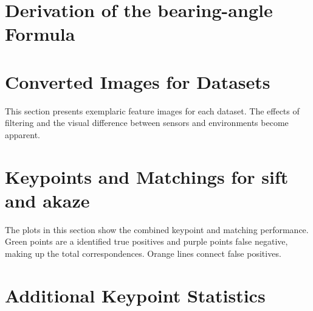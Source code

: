 \documentclass[numbers=noenddot,doktyp=marbeit,fontsize=12pt,sprache=english,hausschrift=true,draft=false]{TUBAFarbeiten}
\begin{document}
\begin{appendix}
    \renewcommand*{\thepage}{\thesection\arabic{page}}
    \renewcommand{\thetable}{\thesection\arabic{table}}
    \renewcommand{\thefigure}{\thesection\arabic{figure}}

    \newpage

    \section{Derivation of the \Gls{bearing-angle} Formula}\label{sec:bearing_derivation}
    
    \newpage

    \section{Converted Images for Datasets}

    This section presents exemplaric feature images for each dataset.
    The effects of filtering and the visual difference between sensors and environments become apparent.
    {\setlength{\abovecaptionskip}{-20pt}%
     \setlength{\belowcaptionskip}{-30pt}%
     \setlength{\floatsep}{1pt plus 1pt minus 1pt}%
     \setlength{\textfloatsep}{1pt plus 1.0pt minus 2.0pt}
     \setlength{\intextsep}{1pt plus 1.0pt minus 2.0pt}
    
    
    
    
    
    }
    \newpage

    \section{Keypoints and Matchings for \acrshort{sift} and \acrshort{akaze}}
    The plots in this section show the combined keypoint and matching performance.
    Green points are a identified true positives and purple points false negative, making up the total correspondences.
    Orange lines connect false positives.
    
    
    \newpage

    \section{Additional Keypoint Statistics}
    
    
    
    
    \newpage
\end{appendix}



\end{document}
